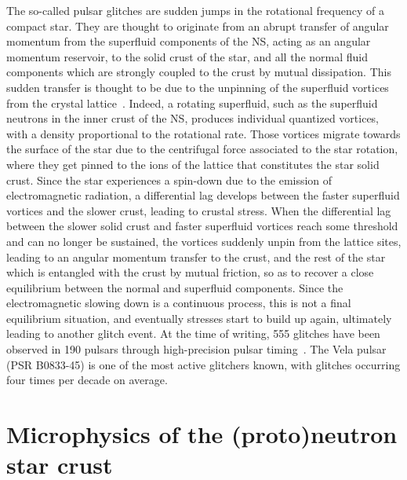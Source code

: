 The so-called pulsar glitches are sudden jumps in the rotational frequency of 
a compact star. They are thought to originate from an abrupt transfer of 
angular momentum from the superfluid components of the NS, acting as an angular 
momentum reservoir, to the solid crust of the star, and all the normal fluid
components which are strongly coupled to the crust by mutual dissipation. This
sudden transfer is thought to be due to the unpinning of the superfluid 
vortices from the crystal lattice~\cite{Anderson1975}. 
%
Indeed, a rotating superfluid, such as the superfluid neutrons in the inner 
crust of the NS, produces individual quantized vortices, with a density 
proportional to the rotational rate. Those vortices migrate towards the surface 
of the star due to the centrifugal force associated to the star rotation, where 
they get pinned to the ions of the lattice that constitutes the star solid 
crust. Since the star experiences a spin-down due to the emission of 
electromagnetic radiation, a differential lag develops between the faster 
superfluid vortices and the slower crust, leading to crustal stress. 
%
When the differential lag between the slower solid crust and faster superfluid 
vortices reach some threshold and can no longer be sustained, the vortices
suddenly unpin from the lattice sites, leading to an angular momentum transfer
to the crust, and the rest of the star which is entangled with the crust by
mutual friction, so as to recover a close equilibrium between the normal and
superfluid components. Since the electromagnetic slowing down is a continuous
process, this is not a final equilibrium situation, and eventually stresses 
start to build up again, ultimately leading to another glitch event.
%
At the time of writing, 555 glitches have been observed in 190 pulsars through 
high-precision pulsar timing~\cite{Espinoza2011,Glitches}. The Vela pulsar 
(PSR B0833-45) is one of the most active glitchers known, with glitches 
occurring four times per decade on average.

\section*{Microphysics of the (proto)neutron star crust}

